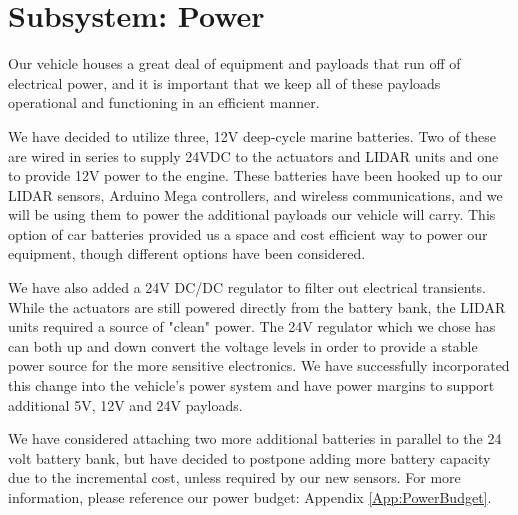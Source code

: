\chapter{Subsystem: Power}

Our vehicle houses a great deal of equipment and payloads that run off of electrical power, and it is important that we keep all of these payloads operational and functioning in an efficient manner.

We have decided to utilize three, 12V deep-cycle marine batteries. Two of these are wired in series to supply 24VDC to the actuators and LIDAR units and one to provide 12V power to the engine. These batteries have been hooked up to our LIDAR sensors, Arduino Mega controllers, and wireless communications, and we will be using them to power the additional payloads our vehicle will carry. This option of car batteries provided us a space and cost efficient way to power our equipment, though different options have been considered.

We have also added a 24V DC/DC regulator to filter out electrical transients. While the actuators are still powered directly from the battery bank, the LIDAR units required a source of "clean" power. The 24V regulator which we chose has can both up and down convert the voltage levels in order to provide a stable power source for the more sensitive electronics. We have successfully incorporated this change into the vehicle's power system and have power margins to support additional 5V, 12V and 24V payloads.

We have considered attaching two more additional batteries in parallel to the 24 volt battery bank, but have decided to postpone adding more battery capacity due to the incremental cost, unless required by our new sensors. For more information, please reference our power budget: Appendix \ref{App:PowerBudget}.